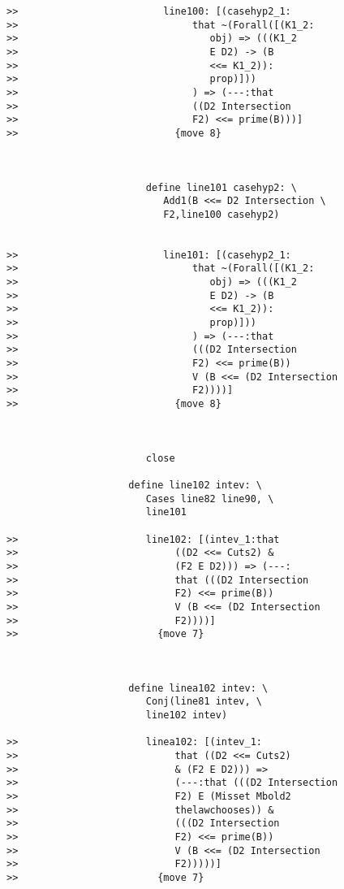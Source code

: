 \documentclass[12pt]{article}
\begin{document}
\begin{verbatim}
>>                         line100: [(casehyp2_1:
>>                              that ~(Forall([(K1_2:
>>                                 obj) => (((K1_2
>>                                 E D2) -> (B
>>                                 <<= K1_2)):
>>                                 prop)]))
>>                              ) => (---:that
>>                              ((D2 Intersection
>>                              F2) <<= prime(B)))]
>>                           {move 8}



                        define line101 casehyp2: \
                           Add1(B <<= D2 Intersection \
                           F2,line100 casehyp2)


>>                         line101: [(casehyp2_1:
>>                              that ~(Forall([(K1_2:
>>                                 obj) => (((K1_2
>>                                 E D2) -> (B
>>                                 <<= K1_2)):
>>                                 prop)]))
>>                              ) => (---:that
>>                              (((D2 Intersection
>>                              F2) <<= prime(B))
>>                              V (B <<= (D2 Intersection
>>                              F2))))]
>>                           {move 8}



                        close

                     define line102 intev: \
                        Cases line82 line90, \
                        line101

>>                      line102: [(intev_1:that
>>                           ((D2 <<= Cuts2) &
>>                           (F2 E D2))) => (---:
>>                           that (((D2 Intersection
>>                           F2) <<= prime(B))
>>                           V (B <<= (D2 Intersection
>>                           F2))))]
>>                        {move 7}



                     define linea102 intev: \
                        Conj(line81 intev, \
                        line102 intev)

>>                      linea102: [(intev_1:
>>                           that ((D2 <<= Cuts2)
>>                           & (F2 E D2))) =>
>>                           (---:that (((D2 Intersection
>>                           F2) E (Misset Mbold2
>>                           thelawchooses)) &
>>                           (((D2 Intersection
>>                           F2) <<= prime(B))
>>                           V (B <<= (D2 Intersection
>>                           F2)))))]
>>                        {move 7}




\end{verbatim}
\end{document}
